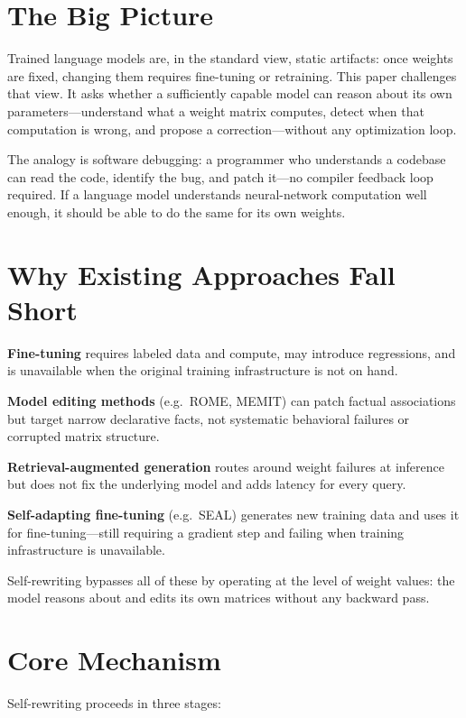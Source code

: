 \documentclass[10pt,twocolumn]{article}
\begin{document}
\section{The Big Picture}

Trained language models are, in the standard view, static artifacts: once weights are fixed, changing them requires fine-tuning or retraining.
This paper challenges that view.
It asks whether a sufficiently capable model can reason about its own parameters---understand what a weight matrix computes, detect when that computation is wrong, and propose a correction---without any optimization loop.

The analogy is software debugging: a programmer who understands a codebase can read the code, identify the bug, and patch it---no compiler feedback loop required.
If a language model understands neural-network computation well enough, it should be able to do the same for its own weights.

\section{Why Existing Approaches Fall Short}

\textbf{Fine-tuning} requires labeled data and compute, may introduce regressions, and is unavailable when the original training infrastructure is not on hand.

\textbf{Model editing methods} (e.g.\ ROME, MEMIT) can patch factual associations but target narrow declarative facts, not systematic behavioral failures or corrupted matrix structure.

\textbf{Retrieval-augmented generation} routes around weight failures at inference but does not fix the underlying model and adds latency for every query.

\textbf{Self-adapting fine-tuning} (e.g.\ SEAL) generates new training data and uses it for fine-tuning---still requiring a gradient step and failing when training infrastructure is unavailable.

Self-rewriting bypasses all of these by operating at the level of weight values: the model reasons about and edits its own matrices without any backward pass.

\section{Core Mechanism}

Self-rewriting proceeds in three stages:
\end{document}
